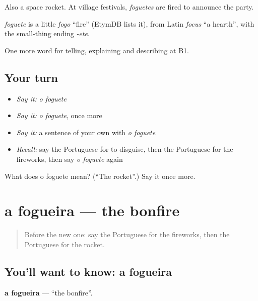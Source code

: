 Also a space rocket. At village festivals, \emph{foguetes} are fired to announce the party.

\begin{cousinweb}
\emph{foguete} is a little \emph{fogo} \textquotedblleft{}fire\textquotedblright{} (EtymDB lists it), from Latin \emph{focus} \textquotedblleft{}a hearth\textquotedblright{}, with the small-thing ending \emph{-ete}.
\end{cousinweb}

\begin{grammarlens}[title={What you've built}]
One more word for telling, explaining and describing at B1.
\end{grammarlens}

\subsection*{Your turn}
\begin{itemize}
\raggedright
  \item \emph{Say it:} \emph{o foguete}
  \item \emph{Say it:} \emph{o foguete}, once more
  \item \emph{Say it:} a sentence of your own with \emph{o foguete}
  \item \emph{Recall:} say the Portuguese for to disguise, then the Portuguese for the fireworks, then say \emph{o foguete} again
\end{itemize}

\begin{tcolorbox}[breakable,colback=teal!4,colframe=teal!35!black,title={Before you move on}]
What does o foguete mean? (\textquotedblleft{}The rocket\textquotedblright{}.) Say it once more.
\end{tcolorbox}
\section[a fogueira]{a fogueira — the bonfire}

\label{lesson:PT-C322-fogueira}



\begin{quote}
Before the new one: say the Portuguese for the fireworks, then the Portuguese for the rocket.
\end{quote}

\subsection*{You'll want to know: a fogueira}
\textbf{a fogueira} — \textquotedblleft{}the bonfire\textquotedblright{}.

